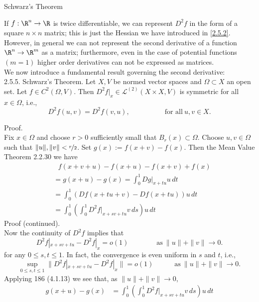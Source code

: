 \documentclass[smaller,hyperref={CJKbookmarks=true}]{beamer}
\begin{document}
\begin{frame}{Schwarz's Theorem}
\begin{spacing}{1.2}
If $f:\R^n\to\R$ is twice dif{}ferentiable, we can represent $D^2f$ in the form of a square $n\times n$ matrix; this is just the Hessian we have introduced in \eqref{2.5.2}.\\[5pt]
However, in general we can not represent the second derivative of a
function $\R^n\to\R^m$ as a matrix; furthermore, even in the case of potential functions $(m=1)$ higher order derivatives can not be expressed as matrices.\\[6pt]
We now introduce a fundamental result governing the second derivative:\\[5pt]
\alert{2.5.5. Schwarz's Theorem.} Let $X,V$ be normed vector spaces and $\Omega\subset X$ an open set. Let $f\in C^2(\Omega,V)$. Then $D^2f|_x\in\mathcal{L}^{(2)}(X\times X,V)$ is symmetric for all $x\in\Omega$, i.e.,
\[D^2f(u,v)=D^2f(v,u),\qquad\qquad\quad
\text{for all}~u,v\in X.\]
\end{spacing}
\newpage
\begin{spacing}{1}
\alert{Proof.}\\
Fix $x\in\Omega$ and choose $r>0$ suf{}ficiently small that $B_r(x)\subset\Omega$. Choose $u,v\in\Omega$ such that $\|u\|,\|v\|<\nicefrac{r}{2}$. Set $g(x):=f(x+v)-f(x)$. Then the Mean Value Theorem 2.2.30 we have
\begin{equation*}
  \begin{split}
       &~~~f(x+v+u)-f(x+u)-f(x+v)+f(x)  \\
       &=g(x+u)-g(x)=\int_{0}^{1}Dg|_{x+tu}u\,dt  \\
       &=\int_{0}^{1}\left(Df(x+tu+v)-Df(x+tu)\right)u\,dt  \\
       &=\int_{0}^{1}\left(\int_{0}^{1}D^2f|_{x+sv+tu}v\,ds\right)u\,dt
  \end{split}
\end{equation*}
\newpage
\alert{Proof (continued).}\\
Now the continuity of $D^2f$ implies that
\[D^2f|_{x+sv+tu}-D^2f|_x=o(1)\qquad\qquad
\text{as}~\|u\|+\|v\|\to0.\]
for any $0\leq s,t\leq 1$. In fact, the convergence is even uniform in $s$ and $t$, i.e.,
\[\sup\limits_{0\leq s,t\leq 1}\|D^2f|_{x+sv+tu}-D^2f|_x\|=o(1)\qquad\quad
\text{as}~\|u\|+\|v\|\to0.\]
Applying 186 (4.1.13) we see that, as $\|u\|+\|v\|\to0$,
\begin{equation*}
  \begin{split}
     g(x+u)-g(x) &=\int_{0}^{1}\left(\int_{0}^{1}D^2f|_{x+sv+tu}v\,ds\right)u\,dt \\

\end{split}
\end{equation*}
\end{spacing}
\end{frame}
\end{document}
